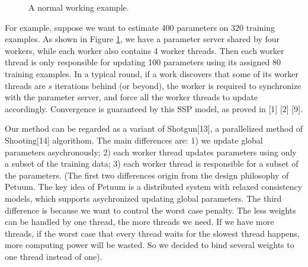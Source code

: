 \documentclass{article} %
\begin{document}
\begin{figure}[h]
\begin{center}
\end{center}
\caption{A normal working example.}
\label{example}
\end{figure}
For example, suppose we want to estimate 400 parameters on 320 training examples. As shown in Figure \ref{example}, we have a parameter server shared by four workers, while each worker also contains 4 worker threads. Then each worker thread is only responsible for updating 100 parameters using its assigned 80 training examples. In a typical round, if a work discovers that some of its worker threads are $s$ iterations behind (or beyond), the worker is required to synchronize with the parameter server, and force all the worker threads to update accordingly. Convergence is guaranteed by this SSP model, as proved in [1] [2] [9].

Our method can be regarded as a variant of Shotgun[13], a parallelized method of Shooting[14] algorithom. The main differences are: 1) we update global parameters asychronously; 2) each worker thread updates parameters using only a subset of the training data; 3) each worker thread is responsible for a subset of the parameters. (The first two differences origin from the design philosophy of Petuum. The key idea of Petuum is a distributed system with relaxed consistency models, which supports asychronized updating global parameters. The third difference is because we want to control the worst case penalty. The less weights can be handled by one thread, the more threads we need. If we have more threads, if the worst case that every thread waits for the slowest thread happens, more computing power will be wasted. So we decided to bind several weights to one thread instead of one).
\end{document}
